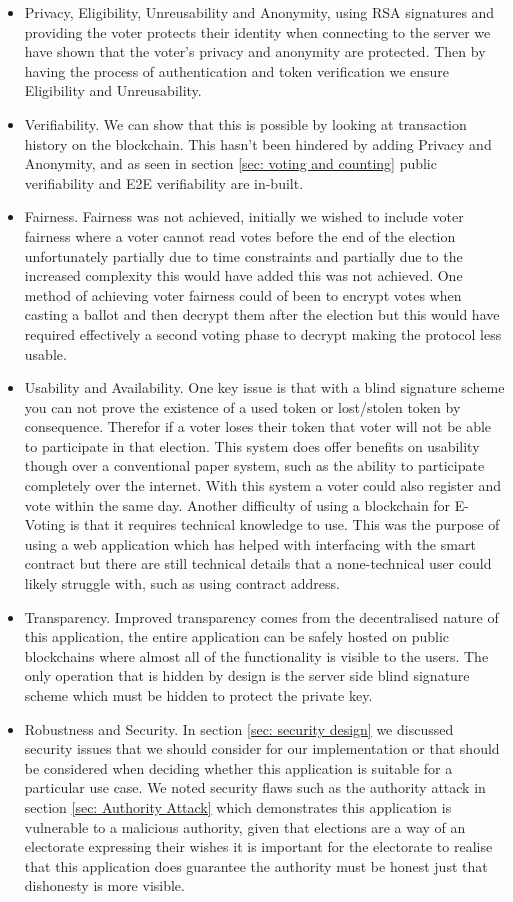 \documentclass{entcs}
\begin{document}
\begin{itemize}
    \item Privacy, Eligibility, Unreusability and Anonymity, using RSA signatures and providing the voter protects their identity when connecting to the server we have shown that the voter's privacy and anonymity are protected. Then by having the process of authentication and token verification we ensure Eligibility and Unreusability. 
    \item Verifiability. We can show that this is possible by looking at transaction history on the blockchain. This hasn't been hindered by adding Privacy and Anonymity, and as seen in section \ref{sec: voting and counting} public verifiability and E2E verifiability are in-built.
    \item Fairness. Fairness was not achieved, initially we wished to include voter fairness where a voter cannot read votes before the end of the election unfortunately partially due to time constraints and partially due to the increased complexity this would have added this was not achieved. One method of achieving voter fairness could of been to encrypt votes when casting a ballot and then decrypt them after the election but this would have required effectively a second voting phase to decrypt making the protocol less usable.
    \item Usability and Availability. One key issue is that with a blind signature scheme you can not prove the existence of a used token or lost/stolen token by consequence. Therefor if a voter loses their token that voter will not be able to participate in that election. This system does offer benefits on usability though over a conventional paper system, such as the ability to participate completely over the internet. With this system a voter could also register and vote within the same day. Another difficulty of using a blockchain for E-Voting is that it requires technical knowledge to use. This was the purpose of using a web application which has helped with interfacing with the smart contract but there are still technical details that a none-technical user could likely struggle with, such as using contract address.
    \item Transparency. Improved transparency comes from the decentralised nature of this application, the entire application can be safely hosted on public blockchains where almost all of the functionality is visible to the users. The only operation that is hidden by design is the server side blind signature scheme which must be hidden to protect the private key.
    \item Robustness and Security. In section \ref{sec: security design} we discussed security issues that we should consider for our implementation or that should be considered when deciding whether this application is suitable for a particular use case. We noted security flaws such as the authority attack in section \ref{sec: Authority Attack} which demonstrates this application is vulnerable to a malicious authority, given that elections are a way of an electorate expressing their wishes it is important for the electorate to realise that this application does guarantee the authority must be honest just that dishonesty is more visible.
\end{itemize}
\end{document}
